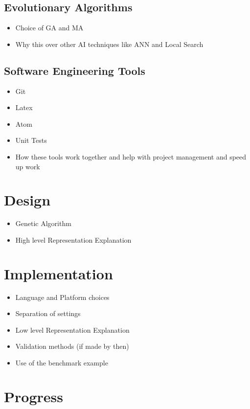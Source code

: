 \documentclass[a4paper]{article}
\begin{document}
\subsection{Evolutionary Algorithms}
\begin{itemize}
    \item Choice of GA and MA
    \item Why this over other AI techniques like ANN and Local Search
\end{itemize}
\subsection{Software Engineering Tools}
\begin{itemize}
    \item Git
    \item Latex
    \item Atom
    \item Unit Tests
    \item How these tools work together and help with project management and speed up work
\end{itemize}

\section{Design}
\begin{itemize}
    \item Genetic Algorithm
    \item High level Representation Explanation
\end{itemize}

\section{Implementation}
\begin{itemize}
    \item Language and Platform choices
    \item Separation of settings
    \item Low level Representation Explanation
    \item Validation methods (if made by then)
    \item Use of the benchmark example
\end{itemize}

\section{Progress}
\end{document}
